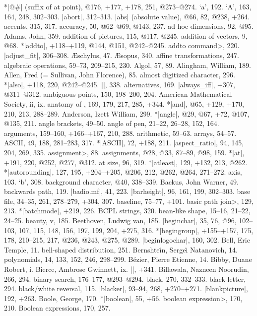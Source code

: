 *|@#| (suffix of at point), @176, +177, +178, 251, @273--@274.
\newletter
`a', 192.
`A', 163, 164, 248, 302--303.
|abort|, 312--313.
|abs| (absolute value), @66, 82, @238, +264.
accents, 315, 317.
accuracy, 50, @62--@69, @143, 237.
ad hoc dimensions, 92, @95.
Adams, John, 359.
addition of pictures, 115, @117, @245.
addition of vectors, 9, @68.
*|addto|, +118--+119, @144, @151, @242--@245.
\<addto command>, 220.
|adjust_fit|, 306--308.
{\AE}schylus, 47.
{\AE}sopus, 340.
affine transformations, 247.
algebraic operations, 59--73, 209--215, 230.
Algol, 57, 89.
Alingham, William, 189.
Allen, Fred (= Sullivan, John Florence), 85.
almost digitized character, 296.
*|also|, +118, 220, @242--@245.
|\alternation|, 338.
alternatives, 169.
|always_iff|, +307, @311--@312.
ambiguous points, 150, 198--200, 204.
American Mathematical Society, ii, ix.
anatomy of \MF, 169, 179, 217, 285, +344.
*|and|, @65, +129, +170, 210, 213, 288--289.
Anderson, Izett William, 299.
*|angle|, @29, @67, +72, @107, @135, 211.
angle brackets, 49--50.
angle of pen, 21--22, 26--28, 152, 164.
arguments, 159--160, +166--+167, 210, 288.
arithmetic, 59--63.
arrays, 54--57.
ASCII, 49, 188, 281--283, 317.
*|ASCII|, 72, +188, 211.
|aspect_ratio|, 94, 145, 204, 269, 335.
\<assignment>, 88.
assignments, @28, @33, 87--89, @98, 159.
*|at|, +191, 220, @252, @277, @312.
at size, 96, 319.
*|atleast|, 129, +132, 213, @262.
*|autorounding|, 127, 195, +204--+205, @206, 212, @262, @264, 271--272.
axis, 103.
\newletter
`b', 308.
background character, @40, 338--339.
Backus, John Warner, 49.
backwards path, 119.
|badio.mf|, 41, 223.
|barheight|, 96, 161, 199, 302--303.
base file, 34--35, 261, 278--279, +304, 307.
baseline, 75--77, +101.
\<basic path join>, 129, 213.
*|batchmode|, +219, 226.
BCPL strings, 320.
bean-like shape, 15--16, 21--22, 24--25.
beauty, v, 185.
Beethoven, Ludwig van, 185.
|beginchar|, 35, 76, @96, 102--103, 107, 115, 148, 156, 197, 199, 204,
 +275, 316.
*|begingroup|, +155--+157, 175, 178, 210--215, 217, @236, @243, @275, @289.
|beginlogochar|, 160, 302.
Bell, Eric Temple, 11.
bell-shaped distribution, 251.
Bernshte{\u\i}n, Serge{\u\i} \thinspace Natanovich, 14.
\sub polynomials, 14, 133, 152, 246, 298--299.
B\'ezier, Pierre Etienne, 14.
Bibby, Duane Robert, i.
Bierce, Ambrose Gwinnett, ix.
|\bigtest|, +341.
Billawala, Nazneen Noorudin, 266, 294.
binary search, 176--177, @293--@294.
black, 270, 332--333.
black-letter, 294.
black/white reversal, 115.
|blacker|, 93--94, 268, +270--+271.
|blankpicture|, 192, +263.
Boole, George, 170.
*|boolean|, 55, +56.
\<boolean expression>, 170, 210.
Boolean expressions, 170, 257.
